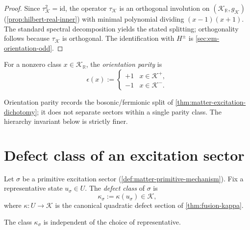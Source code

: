 \begin{proof}
Since $\tau_{\mathcal K}^2 = \mathrm{id}$, the operator $\tau_{\mathcal K}$
is an orthogonal involution on $(\mathcal K_{\mathbb R}, g_{\mathcal K})$
(\cref{prop:hilbert-real-inner}) with minimal polynomial dividing
$(x-1)(x+1)$.
The standard spectral decomposition yields the stated splitting;
orthogonality follows because $\tau_{\mathcal K}$ is orthogonal.
The identification with $H^\pm$ is \cref{sec:em-orientation-odd}.
\end{proof}

\begin{definition}
\label{def:spectral-orientation-parity}
For a nonzero class $x \in \mathcal K_{\mathbb R}$, the
\emph{orientation parity} is
\[
  \epsilon(x) :=
  \begin{cases}
    +1 & x \in \mathcal K^+, \\
    -1 & x \in \mathcal K^-.
  \end{cases}
\]
\end{definition}

\begin{remark}
\label{rem:parity-not-hierarchy}
Orientation parity records the bosonic/fermionic split of
\cref{thm:matter-excitation-dichotomy}; it does not separate sectors
within a single parity class.
The hierarchy invariant below is strictly finer.
\end{remark}

\section{Defect class of an excitation sector}
\label{sec:spectral-defect}

\begin{definition}
\label{def:spectral-defect-class}
Let $\sigma$ be a primitive excitation sector
(\cref{def:matter-primitive-mechanism}).
Fix a representative state $u_\sigma \in U$.
The \emph{defect class} of $\sigma$ is
\[
  \kappa_\sigma := \kappa(u_\sigma) \in \mathcal K,
\]
where $\kappa : U \to \mathcal K$ is the canonical quadratic defect
section of \cref{thm:fusion-kappa}.
\end{definition}

\begin{lemma}
\label{lem:spectral-defect-welldefined}
The class $\kappa_\sigma$ is independent of the choice of representative.
\end{lemma}

